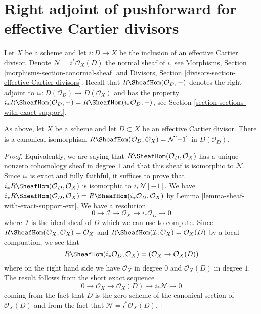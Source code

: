 \section{Right adjoint of pushforward for effective Cartier divisors}
\label{section-dualizing-Cartier}

\noindent
Let $X$ be a scheme and let $i : D \to X$ be the inclusion of an
effective Cartier divisor. Denote $\mathcal{N} = i^*\mathcal{O}_X(D)$
the normal sheaf of $i$, see
Morphisms, Section \ref{morphisms-section-conormal-sheaf}
and
Divisors, Section \ref{divisors-section-effective-Cartier-divisors}.
Recall that $R\SheafHom(\mathcal{O}_D, -)$
denotes the right adjoint to $i_* : D(\mathcal{O}_D) \to D(\mathcal{O}_X)$
and has the property
$i_*R\SheafHom(\mathcal{O}_D, -) = R\SheafHom(i_*\mathcal{O}_D, -)$,
see Section \ref{section-sections-with-exact-support}.

\begin{lemma}
\label{lemma-compute-for-effective-Cartier}
As above, let $X$ be a scheme and let $D \subset X$ be an
effective Cartier divisor. There is a canonical isomorphism
$R\SheafHom(\mathcal{O}_D, \mathcal{O}_X) = \mathcal{N}[-1]$
in $D(\mathcal{O}_D)$.
\end{lemma}

\begin{proof}
Equivalently, we are saying that $R\SheafHom(\mathcal{O}_D, \mathcal{O}_X)$
has a unique nonzero cohomology sheaf in degree $1$ and that this
sheaf is isomorphic to $\mathcal{N}$. Since $i_*$ is exact and fully
faithful, it suffices to prove that
$i_*R\SheafHom(\mathcal{O}_D, \mathcal{O}_X)$ is isomorphic
to $i_*\mathcal{N}[-1]$. We have
$i_*R\SheafHom(\mathcal{O}_D, \mathcal{O}_X) =
R\SheafHom(i_*\mathcal{O}_D, \mathcal{O}_X)$
by Lemma \ref{lemma-sheaf-with-exact-support-ext}. We have a resolution
$$
0 \to \mathcal{I} \to \mathcal{O}_X \to i_*\mathcal{O}_D \to 0
$$
where $\mathcal{I}$ is the ideal sheaf of $D$
which we can use to compute. Since
$R\SheafHom(\mathcal{O}_X, \mathcal{O}_X) = \mathcal{O}_X$ and
$R\SheafHom(\mathcal{I}, \mathcal{O}_X) = \mathcal{O}_X(D)$ by
a local compuation, we see that
$$
R\SheafHom(i_*\mathcal{O}_D, \mathcal{O}_X) =
(\mathcal{O}_X \to \mathcal{O}_X(D))
$$
where on the right hand side we have $\mathcal{O}_X$ in degree $0$
and $\mathcal{O}_X(D)$ in degree $1$. The result follows from the
short exact sequence
$$
0 \to \mathcal{O}_X \to \mathcal{O}_X(D) \to i_*\mathcal{N} \to 0
$$
coming from the fact that $D$ is the zero scheme of the canonical section
of $\mathcal{O}_X(D)$ and from the fact that
$\mathcal{N} = i^*\mathcal{O}_X(D)$.
\end{proof}

